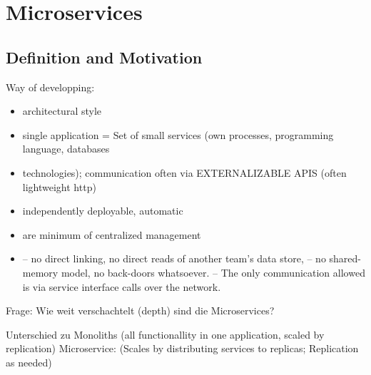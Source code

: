 \documentclass[a4paper,12pt]{article}%
\begin{document}
\newpage
\section{Microservices}
\subsection{Definition and Motivation}
Way of developping: 
\begin{itemize}
	
\item architectural style\\
\item single application = Set of small services (own processes, programming language, databases \item technologies); communication often via EXTERNALIZABLE APIS (often lightweight http)  \\
\item independently deployable, automatic \\
\item are minimum of centralized management \\
\item – no direct linking, no direct reads of another team’s data store,
– no shared-memory model, no back-doors whatsoever.
– The only communication allowed is via service interface calls over the network.
\end{itemize}
Frage: Wie weit verschachtelt (depth) sind die Microservices?

Unterschied zu Monoliths (all functionallity in one application, scaled by replication)
Microservice: (Scales by distributing services to replicas; Replication as needed)
\end{document}
